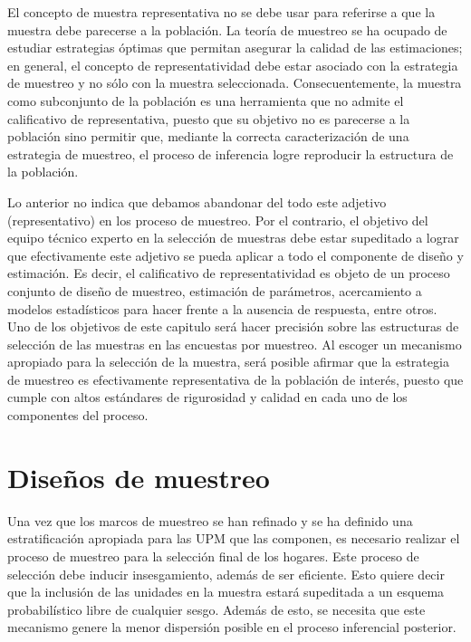 \documentclass[
  12pt,
  spanish,
]{book}
\begin{document}
El concepto de muestra representativa no se debe usar para referirse a que la muestra debe parecerse a la población. La teoría de muestreo se ha ocupado de estudiar estrategias óptimas que permitan asegurar la calidad de las estimaciones; en general, el concepto de representatividad debe estar asociado con la estrategia de muestreo y no sólo con la muestra seleccionada. Consecuentemente, la muestra como subconjunto de la población es una herramienta que no admite el calificativo de representativa, puesto que su objetivo no es parecerse a la población sino permitir que, mediante la correcta caracterización de una estrategia de muestreo, el proceso de inferencia logre reproducir la estructura de la población.

Lo anterior no indica que debamos abandonar del todo este adjetivo (representativo) en los proceso de muestreo. Por el contrario, el objetivo del equipo técnico experto en la selección de muestras debe estar supeditado a lograr que efectivamente este adjetivo se pueda aplicar a todo el componente de diseño y estimación. Es decir, el calificativo de representatividad es objeto de un proceso conjunto de diseño de muestreo, estimación de parámetros, acercamiento a modelos estadísticos para hacer frente a la ausencia de respuesta, entre otros. Uno de los objetivos de este capitulo será hacer precisión sobre las estructuras de selección de las muestras en las encuestas por muestreo. Al escoger un mecanismo apropiado para la selección de la muestra, será posible afirmar que la estrategia de muestreo es efectivamente representativa de la población de interés, puesto que cumple con altos estándares de rigurosidad y calidad en cada uno de los componentes del proceso.

\hypertarget{diseuxf1os-de-muestreo}{%
\section{Diseños de muestreo}\label{diseuxf1os-de-muestreo}}

Una vez que los marcos de muestreo se han refinado y se ha definido una estratificación apropiada para las UPM que las componen, es necesario realizar el proceso de muestreo para la selección final de los hogares. Este proceso de selección debe inducir insesgamiento, además de ser eficiente. Esto quiere decir que la inclusión de las unidades en la muestra estará supeditada a un esquema probabilístico libre de cualquier sesgo. Además de esto, se necesita que este mecanismo genere la menor dispersión posible en el proceso inferencial posterior.
\end{document}
